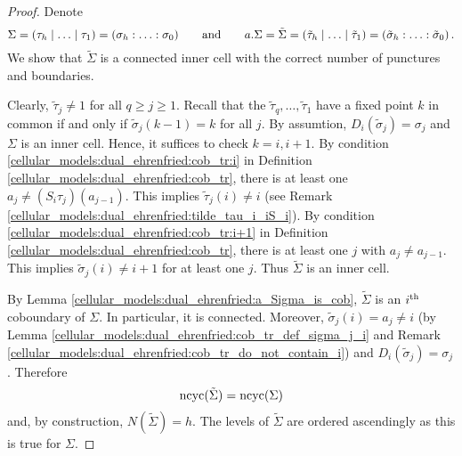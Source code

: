 \begin{proof}
    Denote
    \[
        \Sigma = \inhom = \homog \mspc{and}{20} a.\Sigma = \tilde\Sigma = \inhom[\tilde\tau] = \homog[\tilde\sigma] \,.
    \]
    We show that $\tilde\Sigma$ is a connected inner cell with the correct number of punctures and boundaries.
    
    Clearly, $\tilde\tau_j \neq 1$ for all $q \ge j \ge 1$.
    Recall that the $\tilde\tau_q, \ldots, \tilde\tau_1$ have a fixed point $k$ in common if and only if $\tilde\sigma_j(k-1) = k$ for all $j$.
    By assumtion, $D_i(\tilde\sigma_j) = \sigma_j$ and $\Sigma$ is an inner cell.
    Hence, it suffices to check $k=i,i+1$.
    By condition \ref{cellular_models:dual_ehrenfried:cob_tr:i} in Definition \ref{cellular_models:dual_ehrenfried:cob_tr},
    there is at least one $a_j \neq (S_i\tau_j)(a_{j-1})$.
    This implies $\tilde\tau_j(i) \neq i$ (see Remark \ref{cellular_models:dual_ehrenfried:tilde_tau_i_iS_i}).
    By condition \ref{cellular_models:dual_ehrenfried:cob_tr:i+1} in Definition \ref{cellular_models:dual_ehrenfried:cob_tr},
    there is at least one $j$ with $a_j \neq a_{j-1}$.
    This implies $\tilde\sigma_j(i) \neq i+1$ for at least one $j$.
    Thus $\tilde\Sigma$ is an inner cell.
    
    By Lemma \ref{cellular_models:dual_ehrenfried:a_Sigma_is_cob}, $\tilde\Sigma$ is an $i^{\text{th}}$ coboundary of $\Sigma$.
    In particular, it is connected.
    Moreover, $\tilde\sigma_j(i) = a_j \neq i$ (by Lemma \ref{cellular_models:dual_ehrenfried:cob_tr_def_sigma_j_i} and Remark \ref{cellular_models:dual_ehrenfried:cob_tr_do_not_contain_i}) 
    and $D_i(\tilde\sigma_j) = \sigma_j$.
    Therefore
    \[
        \operatorname{ncyc}(\tilde\Sigma) = \operatorname{ncyc}(\Sigma)
    \]
    and, by construction, $N(\tilde\Sigma) = h$.
    The levels of $\tilde\Sigma$ are ordered ascendingly as this is true for $\Sigma$.
\end{proof}

